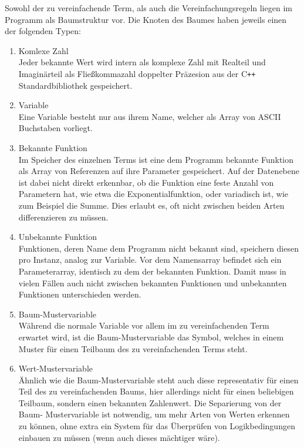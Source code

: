 \documentclass{article}
\begin{document}
\clearpage
Sowohl der zu vereinfachende Term, als auch die Vereinfachungsregeln liegen im Programm als Baumstruktur vor. Die Knoten des Baumes haben jeweils einen der folgenden Typen:
\begin{enumerate}
    \item Komlexe Zahl \\
    Jeder bekannte Wert wird intern als komplexe Zahl mit Realteil und Imaginärteil als Fließkommazahl doppelter Präzesion aus der C\texttt{++} Standardbibliothek gespeichert.
    \item Variable \\
    Eine Variable besteht nur aus ihrem Name, welcher als Array von ASCII Buchstaben vorliegt.
    \item Bekannte Funktion \\
    Im Speicher des einzelnen Terms ist eine dem Programm bekannte Funktion als Array von Referenzen auf ihre Parameter gespeichert. Auf der Datenebene ist dabei nicht direkt erkennbar, ob die Funktion eine feste Anzahl von Parametern hat, wie etwa die Exponentialfunktion, oder variadisch ist, wie zum Beispiel die Summe. Dies erlaubt es, oft nicht zwischen beiden Arten differenzieren zu müssen.
    \item Unbekannte Funktion \\
    Funktionen, deren Name dem Programm nicht bekannt sind, speichern diesen pro Instanz, analog zur Variable. Vor dem Namensarray befindet sich ein Parameterarray, identisch zu dem der bekannten Funktion. Damit muss in vielen Fällen auch nicht zwischen bekannten Funktionen und unbekannten Funktionen unterschieden werden.
    \item Baum-Mustervariable \\
    Während die normale Variable vor allem im zu vereinfachenden Term erwartet wird, ist die Baum-Mustervariable das Symbol, welches in einem Muster für einen Teilbaum des zu vereinfachenden Terms steht. 
    \item Wert-Mustervariable \\
    Ähnlich wie die Baum-Mustervariable steht auch diese representativ für einen Teil des zu vereinfachenden Baums, hier allerdings nicht für einen beliebigen Teilbaum, sondern einen bekannten Zahlenwert. Die Separierung von der Baum- Mustervariable ist notwendig, um mehr Arten von Werten erkennen zu können, ohne extra ein System für das Überprüfen von Logikbedingungen einbauen zu müssen (wenn auch dieses mächtiger wäre).
\end{enumerate}
\clearpage
\end{document}
